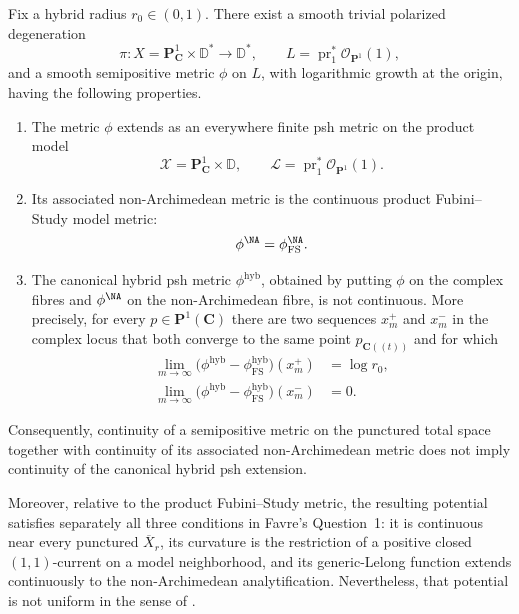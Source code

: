 \begin{theorem}\label{thm:hybrid-endpoint-continuity-counterexample}
Fix a hybrid radius \(r_0\in(0,1)\).  There exist a smooth trivial
polarized degeneration
\[
 \pi\colon X=\mathbf P^1_{\mathbf C}\times\mathbb D^*
       \longrightarrow\mathbb D^*,
 \qquad
 L=\operatorname{pr}_1^*\mathcal O_{\mathbf P^1}(1),
\]
and a smooth semipositive metric \(\phi\) on \(L\), with logarithmic
growth at the origin, having the following properties.
\begin{enumerate}
\item The metric \(\phi\) extends as an everywhere finite psh metric on
the product model
\[
 \mathcal X=\mathbf P^1_{\mathbf C}\times\mathbb D,
 \qquad
 \mathcal L=\operatorname{pr}_1^*\mathcal O_{\mathbf P^1}(1).
\]
\item Its associated non-Archimedean metric is the continuous product
Fubini--Study model metric:
\[
                   \phi^{\NA}
                   =\phi_{\mathrm{FS}}^{\NA}.
\]
\item The canonical hybrid psh metric \(\phi^{\mathrm{hyb}}\), obtained
by putting \(\phi\) on the complex fibres and
\(\phi^{\NA}\) on the non-Archimedean fibre, is not continuous.
More precisely, for every \(p\in\mathbf P^1(\mathbf C)\) there are two
sequences \(x_m^+\) and \(x_m^-\) in the complex locus that both
converge to the same point \(p_{\mathbf C((t))}\) and for which
\[
\begin{aligned}
 \lim_{m\to\infty}
 \bigl(\phi^{\mathrm{hyb}}
       -\phi_{\mathrm{FS}}^{\mathrm{hyb}}\bigr)(x_m^+)
   &=\log r_0,\\
 \lim_{m\to\infty}
 \bigl(\phi^{\mathrm{hyb}}
       -\phi_{\mathrm{FS}}^{\mathrm{hyb}}\bigr)(x_m^-)
   &=0.
\end{aligned}
\]
\end{enumerate}
Consequently, continuity of a semipositive metric on the punctured total
space together with continuity of its associated non-Archimedean metric
does not imply continuity of the canonical hybrid psh extension.

Moreover, relative to the product Fubini--Study metric, the resulting
potential satisfies separately all three conditions in Favre's
Question~1: it is continuous near every punctured
\(\overline X_r\), its curvature is the restriction of a positive
closed \((1,1)\)-current on a model neighborhood, and its
generic-Lelong function extends continuously to the non-Archimedean
analytification.  Nevertheless, that potential is not uniform in the
sense of \cite[Definition~4.1]{Favre20Hybrid}.
\end{theorem}
